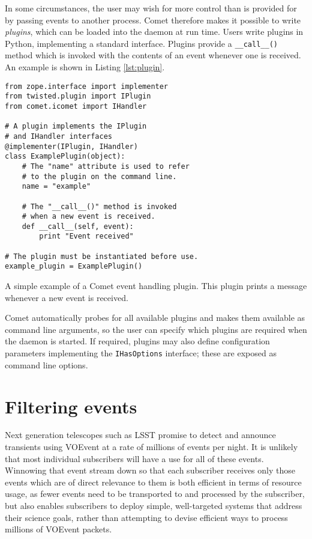\documentclass[5p,authoryear]{elsarticle}
\begin{document}
In some circumstances, the user may wish for more control than is provided for
by passing events to another process. Comet therefore makes it possible to
write \textit{plugins}, which can be loaded into the daemon at run time.
Users write plugins in Python, implementing a standard interface. Plugins
provide a \texttt{\_\_call\_\_()} method which is invoked with the contents of
an event whenever one is received. An example is shown in Listing
\ref{lst:plugin}.

\begin{listing}
\begin{verbatim}
from zope.interface import implementer
from twisted.plugin import IPlugin
from comet.icomet import IHandler

# A plugin implements the IPlugin
# and IHandler interfaces
@implementer(IPlugin, IHandler)
class ExamplePlugin(object):
    # The "name" attribute is used to refer
    # to the plugin on the command line.
    name = "example"

    # The "__call__()" method is invoked
    # when a new event is received.
    def __call__(self, event):
        print "Event received"

# The plugin must be instantiated before use.
example_plugin = ExamplePlugin()
\end{verbatim}
\caption{A simple example of a Comet event handling plugin. This plugin prints
a message whenever a new event is received.}
\label{lst:plugin}
\end{listing}

Comet automatically probes for all available plugins and makes them available
as command line arguments, so the user can specify which plugins are required
when the daemon is started. If required, plugins may also define configuration
parameters implementing the \texttt{IHasOptions} interface; these are exposed
as command line options.

\section{Filtering events}
\label{sec:filter}

Next generation telescopes such as LSST promise to detect and announce
transients using VOEvent at a rate of millions of events per night.  It is
unlikely that most individual subscribers will have a use for all of these
events. Winnowing that event stream down so that each subscriber receives only
those events which are of direct relevance to them is both efficient in terms
of resource usage, as fewer events need to be transported to and processed by
the subscriber, but also enables subscribers to deploy simple, well-targeted
systems that address their science goals, rather than attempting to devise
efficient ways to process millions of VOEvent packets.
\end{document}
